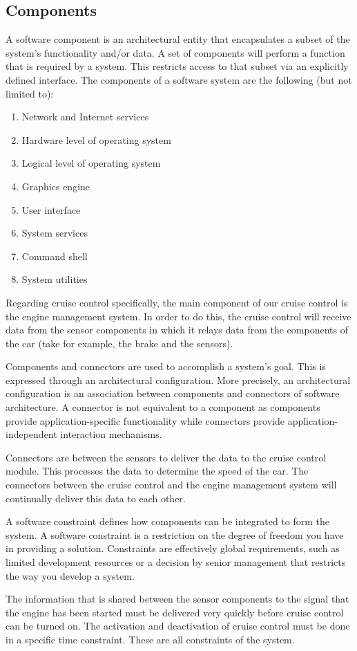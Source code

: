\documentclass[preprint,11pt,3p]{article}
\begin{document}
\subsection{Components} 
A software component is an architectural entity that encapsulates a subset of the system’s functionality and/or data. A set of components will perform a function that is required by a system. This restricts access to that subset via an explicitly defined interface. The components of a software system are the following (but not limited to):
\begin{enumerate} 
	\item Network and Internet services
	\item Hardware level of operating system
	\item Logical level of operating system
	\item Graphics engine
	\item User interface
	\item System services
	\item Command shell
	\item System utilities 
\end{enumerate} 
Regarding cruise control specifically, the main component of our cruise control is the engine management system. In order to do this, the cruise control will receive data from the sensor components in which it relays data from the components of the car (take for example, the brake and the sensors). \par
Components and connectors are used to accomplish a system's goal. This is expressed through an architectural configuration. More precisely, an architectural configuration is an association between components and connectors of software architecture. A connector is not equivalent to a component as components provide application-specific functionality while connectors provide application-independent interaction mechanisms.\par
Connectors are between the sensors to deliver the data to the cruise control module. This processes the data to determine the speed of the car. The connectors between the cruise control and the engine management system will continually deliver this data to each other.\par
A software constraint defines how components can be integrated to form the system. A software constraint is a restriction on the degree of freedom you have in providing a solution. Constraints are effectively global requirements, such as limited development resources or a decision by senior management that restricts the way you develop a system.\par
The information that is shared between the sensor components to the signal that the engine has been started must be delivered very quickly before cruise control can be turned on. The activation and deactivation of cruise control must be done in a specific time constraint. These are all constraints of the system.\par
\end{document}
